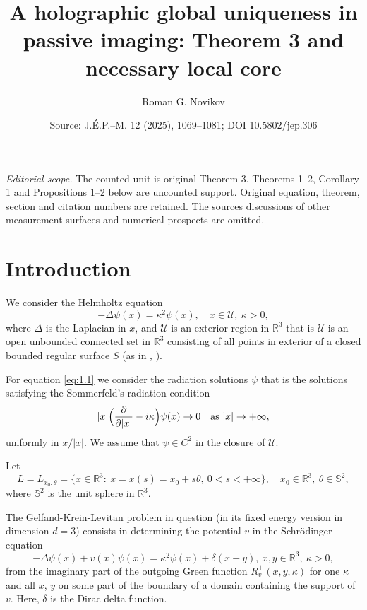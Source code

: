 \documentclass[10pt,a4paper]{amsart}
\title{A holographic global uniqueness in passive imaging: Theorem 3 and necessary local core}
\author{Roman G. Novikov}
\date{Source: J.\'E.P.--M. 12 (2025), 1069--1081; DOI 10.5802/jep.306}
\let\ra\rightarrow
\newcommand{\RR}{\mathbb R}
\theoremstyle{definition}
\begin{document}
\maketitle
\noindent\textit{Editorial scope.} The counted unit is original Theorem 3. Theorems 1--2, Corollary 1 and Propositions 1--2 below are uncounted support. Original equation, theorem, section and citation numbers are retained. The source\textquotesingle s discussions of other measurement surfaces and numerical prospects are omitted.

\section{Introduction}\label{sec:1}

We consider the Helmholtz equation
\begin{equation}
\label{eq:1.1}
-\Delta\psi(x) = \kappa^2 \psi(x),\quad x\in \mathcal{U},\ \kappa>0,
\end{equation}
where $\Delta$ is the Laplacian in $x$, and $\mathcal U$ is an exterior region in $\RR^3$
that is $\mathcal U$ is an open unbounded connected set in $\RR^3$ consisting of all points in exterior of a closed bounded regular surface $S$ (as in \cite{A}, \cite{W}).

For equation \eqref{eq:1.1} we consider the radiation solutions $\psi$ that is the solutions satisfying the Sommerfeld's radiation condition
\begin{equation}\label{eq:1.2}
|x|\Bigl(\frac{\partial}{\partial|x|}-i\kappa\Bigr)\psi(x)\to 0\quad \mbox{as} \ |x|\ra +\infty,
\end{equation}
uniformly in $x/|x|$. We assume that $\psi \in C^2$ in the closure of $\mathcal{U}$.

Let
\begin{equation}\label{eq:1.3}
L=L_{x_0, \theta}=\{x\in\RR^3:\ x=x(s)=x_0+s\theta,\ 0<s <+\infty \}, \quad x_0\in\RR^3, \ \theta\in\mathbb S^2,
\end{equation}
where $\mathbb S^2$ is the unit sphere in $\RR^3$.

The Gelfand-Krein-Levitan problem in question (in its fixed energy version in dimension $d=3$) consists in determining the potential $v$ in the Schrödinger equation
\begin{equation}\label{eq:1.4}
-\Delta\psi(x) +v(x)\psi(x)= \kappa^2 \psi(x) +\delta(x-y),\ x,y\in \RR^3,\ \kappa>0,
\end{equation}
from the imaginary part of the outgoing Green function $R_v^+(x, y, \kappa)$ for one $\kappa$ and all $x$, $y$ on some part of the boundary of a domain containing the support of $v$.
Here, $\delta$ is the Dirac delta function.
\end{document}
